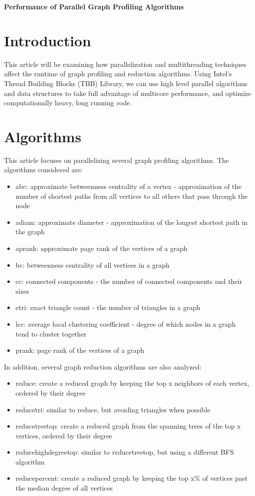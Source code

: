 \documentclass[12pt]{article}
\begin{document}
\begin{center}
{\Large\bf Performance of Parallel Graph Profiling Algorithms}\\
\end{center}

\section{Introduction}

This article will be examining how parallelization and multithreading techniques affect the runtime of graph profiling and reduction algorithms. Using Intel's Thread Building Blocks (TBB) Library, we can use high level parallel algorithms and data structures to take full advantage of multicore performance, and optimize computationally heavy, long running code.

\section{Algorithms}

This article focuses on parallelizing several graph profiling algorithms. The algorithms considered are:

\begin{itemize}
  \item abc: approximate betweenness centrality of a vertex - approximation of the number of shortest paths from all vertices to all others that pass through the node
  \item adiam: approximate diameter - approximation of the longest shortest path in the graph
  \item aprank: approximate page rank of the vertices of a graph
  \item bc: betweenness centrality of all vertices in a graph
  \item cc: connected components - the number of connected components and their sizes
  \item etri: exact triangle count - the number of triangles in a graph
  \item lcc: average local clustering coefficient - degree of which nodes in a graph tend to cluster together
  \item prank: page rank of the vertices of a graph
\end{itemize}

In addition, several graph reduction algorithms are also analyzed:
\begin{itemize}
  \item reduce: create a reduced graph by keeping the top x neighbors of each vertex, ordered by their degree
  \item reducetri: similar to reduce, but avoiding triangles when possible
  \item reducetreetop: create a reduced graph from the spanning trees of the top x vertices, ordered by their degree
  \item reducehighdegreetop: similar to reducetreetop, but using a different BFS algorithm
  \item reducepercent: create a reduced graph by keeping the top x\% of vertices past the median degree of all vertices
\end{itemize}
\end{document}
